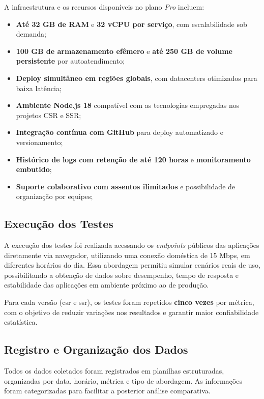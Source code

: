 A infraestrutura e os recursos disponíveis no plano \textit{Pro} incluem:

\begin{itemize}
    \item \textbf{Até 32 GB de RAM} e \textbf{32 vCPU por serviço}, com escalabilidade sob demanda;
    \item \textbf{100 GB de armazenamento efêmero} e \textbf{até 250 GB de volume persistente} por autoatendimento;
    \item \textbf{Deploy simultâneo em regiões globais}, com datacenters otimizados para baixa latência;
    \item \textbf{Ambiente Node.js 18} compatível com as tecnologias empregadas nos projetos CSR e SSR;
    \item \textbf{Integração contínua com GitHub} para deploy automatizado e versionamento;
    \item \textbf{Histórico de logs com retenção de até 120 horas} e \textbf{monitoramento embutido};
    \item \textbf{Suporte colaborativo com assentos ilimitados} e possibilidade de organização por equipes;
\end{itemize}

\subsection{Execução dos Testes}

A execução dos testes foi realizada acessando os \textit{endpoints} públicos das aplicações diretamente via navegador, utilizando uma conexão doméstica de 15 Mbps, em diferentes horários do dia. Essa abordagem permitiu simular cenários reais de uso, possibilitando a obtenção de dados sobre desempenho, tempo de resposta e estabilidade das aplicações em ambiente próximo ao de produção.

Para cada versão (\acrshort{csr} e \acrshort{ssr}), os testes foram repetidos \textbf{cinco vezes} por métrica, com o objetivo de reduzir variações nos resultados e garantir maior confiabilidade estatística. 

\subsection{Registro e Organização dos Dados}

Todos os dados coletados foram registrados em planilhas estruturadas, organizadas por data, horário, métrica e tipo de abordagem. As informações foram categorizadas para facilitar a posterior análise comparativa.

